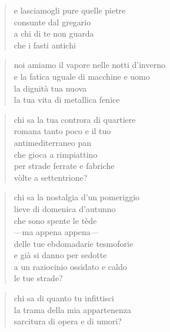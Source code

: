 \begin{verse}
    e lasciamogli pure quelle pietre\\
    consunte dal gregario\\
    a chi di te non guarda\\
    che i fasti antichi
\end{verse}

\begin{verse}
    noi amiamo il vapore nelle notti d'inverno\\
    e la fatica uguale di macchine e uomo\\
    la dignità tua nuova\\
    la tua vita di metallica fenice
\end{verse}

\clearpage


\begin{verse}
    chi sa la tua controra di quartiere\\
    romana tanto poco e il tuo\\
    antimediterraneo pan\\
    che gioca a rimpiattino\\
    per strade ferrate e fabriche\\
    vòlte a settentrione?
\end{verse}

\begin{verse}
    chi sa la nostalgia d'un pomeriggio\\
    lieve di domenica d'autunno\\
    che sono spente le tède\\
    —ma appena appena—\\
    delle tue ebdomadarie tesmoforie\\
    e già si danno per sedotte\\
    a un raziocinio ossidato e caldo\\
    le tue strade?
\end{verse}

\begin{verse}
    chi sa di quanto tu infittisci\\
    la trama della mia appartenenza\\
    sarcitura di opera e di umori?
\end{verse}

\clearpage


